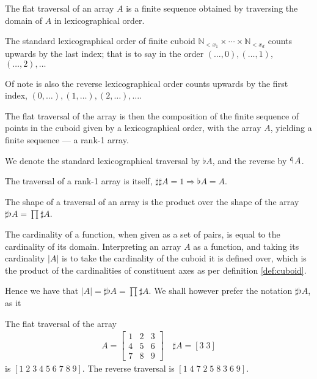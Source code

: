 \documentclass{DIKU-report-variant}
\newcommand\Nat{\mathbb{N}}
\newcommand\impl{\mathrel{\Rightarrow}}
\newcommand\tlaf{\mathop{\rotatebox[origin=c]{180}{$\flat$}}}
\begin{document}
\begin{definition}
  \label{def:flat}
  The flat traversal of an array \(A\) is a finite sequence obtained by
  traversing the domain of \(A\) in lexicographical order.
  
  The standard lexicographical order of finite cuboid
  \(\Nat_{<x_1} \times \cdots \times \Nat_{<x_d}\) counts upwards by the
  last index; that is to say in the order \((\dots,0), (\dots,1),\) \((\dots,2), \dots\)

  Of note is also the reverse lexicographical order counts upwards by the first
  index, \((0,\dots), (1,\dots), (2,\dots), \dots\).

  The flat traversal of the array is then the composition of the finite
  sequence of points in the cuboid given by a lexicographical order,
  with the array \(A\), yielding a finite sequence --- a rank-1 array.

  We denote the standard lexicographical traversal by \(\flat A\),
  and the reverse by \(\tlaf A\).

  The traversal of a rank-1 array is itself, \(\sharp \sharp A = 1 \impl \flat A = A\).

  The shape of a traversal of an array is the product over the shape
  of the array \(\sharp \flat A = \prod \sharp A\).
\end{definition}

\begin{observation}
  \label{ob:cardinality}
  The cardinality of a function, when given as a set of pairs, is equal to
  the cardinality of its domain. Interpreting an array \(A\) as a function, and
  taking its cardinality \(|A|\) is to take the cardinality of the cuboid it is
  defined over, which is the product of the cardinalities of constituent axes as
  per definition \ref{def:cuboid}.

  Hence we have that \(|A| = \sharp \flat A = \prod \sharp A\).
  We shall however prefer the notation \(\sharp \flat A\), as it
\end{observation}

\begin{example}
  \label{ex:flat}
  The flat traversal of the array
  \begin{align*}
    A =
    \begin{bmatrix}
      1 & 2 & 3 \\
      4 & 5 & 6 \\
      7 & 8 & 9
    \end{bmatrix} \quad \sharp A = [3\; 3]
  \end{align*}
  is \([1\; 2\; 3\; 4\; 5\; 6\; 7\; 8\; 9]\).
  The reverse traversal is \([1\; 4\; 7\; 2\; 5\; 8\; 3\; 6\; 9]\).
\end{example}
\end{document}
